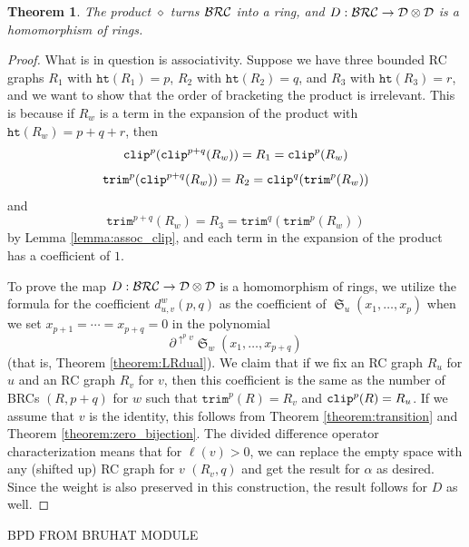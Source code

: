 \documentclass{amsart}
\newtheorem{theorem}{Theorem}[section]
\theoremstyle{definition}
\theoremstyle{remark}
\numberwithin{equation}{subsection}
\DeclareMathOperator{\sch}{\mathfrak{S}}
\newcommand{\shup}{{\uparrow}}
\newcommand{\trm}{\mathtt{trim}}
\newcommand{\hr}{\mathtt{ht}}
\newcommand{\dcoma}{\mathcal{D}}
\begin{document}
\begin{theorem}
	 The product $\diamond$ turns $\mathcal{BRC}$ into a ring, and $D:\BRC\to \dcoma\otimes \dcoma$ is a homomorphism of rings.
\end{theorem}
\begin{proof}
What is in question is associativity. Suppose we have three bounded RC graphs $R_1$ with $\hr(R_1)=p$, $R_2$ with $\hr(R_2)=q$, and $R_3$ with $\hr(R_3)=r$, and we want to show that the order of bracketing the product is irrelevant. This is because if $R_w$ is a term in the expansion of the product with $\hr(R_w)=p+q+r$, then
$$\mathtt{clip}^p(\mathtt{clip}^{p+q}(R_w)) = R_1 = \mathtt{clip}^p(R_w)$$
$$\trm^p(\clp^{p+q}(R_w)) = R_2 = \clp^q(\trm^p(R_w))$$ 
and 
$$\trm^{p+q}(R_w) = R_3 = \trm^q(\trm^{p}(R_w))$$
by Lemma \ref{lemma:assoc_clip}, and each term in the expansion of the product has a coefficient of $1$.

To prove the map $D:\BRC\to \dcoma\otimes \dcoma$ is a homomorphism of rings, we utilize the formula for the coefficient $d_{u,v}^w(p,q)$ as the coefficient of $\sch_u(x_1,\ldots,x_p)$ when we set $x_{p+1}=\cdots=x_{p+q}=0$ in the polynomial
$$\partial^{\shup^p v}\sch_w(x_1,\ldots,x_{p+q})$$
(that is, Theorem \ref{theorem:LRdual}). We claim that if we fix an RC graph $R_u$ for $u$ and an RC graph $R_v$ for $v$, then this coefficient is the same as the number of BRCs $(R, p+q)$ for $w$ such that $\trm^p(R)=R_v$ and $\mathtt{clip}^p(R) = R_u$. If we assume that $v$ is the identity, this follows from Theorem \ref{theorem:transition} and Theorem \ref{theorem:zero_bijection}. The divided difference operator characterization means that for $\ell(v)>0$, we can replace the empty space with any (shifted up) RC graph for $v$ $(R_v, q)$ and get the result for $\alpha$ as desired. Since the weight is also preserved in this construction, the result follows for $D$ as well.
\end{proof}

BPD FROM BRUHAT MODULE
\end{document}

